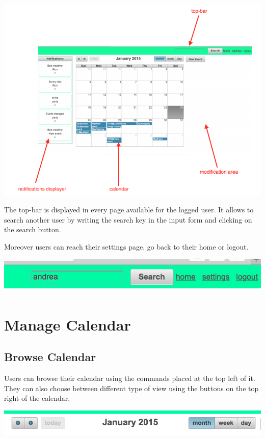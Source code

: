 \documentclass[10pt,a4paper,titlepage]{article}
\begin{document}
\begin{center}
\includegraphics[width=\linewidth]{./images/06_home_arrows}
\end{center}

The top-bar is displayed in every page available for the logged user. It allows to search another user by writing the search key in the input form and clicking on the search button. 

Moreover users can reach their settings page, go back to their home or logout.

\begin{center}
\includegraphics[width=\linewidth]{./images/07_search_bar.png}
\end{center}

\section{Manage Calendar}

\subsection{Browse Calendar}
Users can browse their calendar using the commands placed at the top left of it. They can also choose between different type of view using the buttons on the top right of the calendar.

\begin{center}
\includegraphics[width=\linewidth]{./images/08_calendar_top.png}
\end{center}
\end{document}
